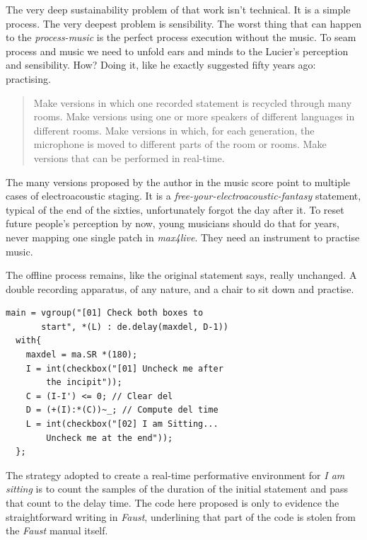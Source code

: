 \documentclass[twoside,a4paper]{article}
\begin{document}

The very deep sustainability problem of that work isn't technical. It is a simple process. The very deepest problem is sensibility. The worst thing that can happen to the \emph{process-music} is the perfect process execution without the music. To seam process and music we need to unfold ears and minds to the Lucier's perception and sensibility. How? Doing it, like he exactly suggested fifty years ago: practising. 

\begin{quote}
Make versions in which one recorded statement is recycled through many rooms. Make versions using one or more speakers of different languages in different rooms. Make versions in which, for each generation, the microphone is moved to different parts of the room or rooms. Make versions that can be performed in real-time. \cite{lais69}
\end{quote}

The many versions proposed by the author in the music score point to multiple cases of electroacoustic staging. It is a \emph{free-your-electroacoustic-fantasy} statement, typical of the end of the sixties, unfortunately forgot the day after it. To reset future people's perception by now, young musicians should do that for years, never mapping one single patch in \emph{max4live}. They need an instrument to practise music. 

The offline process remains, like the original statement says, really unchanged. A double recording apparatus, of any nature, and a chair to sit down and practise. 

\begin{lstlisting}
main = vgroup("[01] Check both boxes to
       start", *(L) : de.delay(maxdel, D-1))
  with{
    maxdel = ma.SR *(180);
    I = int(checkbox("[01] Uncheck me after
        the incipit"));
    C = (I-I') <= 0; // Clear del
    D = (+(I):*(C))~_; // Compute del time
    L = int(checkbox("[02] I am Sitting...
        Uncheck me at the end"));
  };
\end{lstlisting}

The strategy adopted to create a real-time performative environment for \emph{I am sitting} is to count the samples of the duration of the initial statement and pass that count to the delay time. The code here proposed is only to evidence the straightforward writing in \emph{Faust}, underlining that part of the code is stolen from the \emph{Faust} manual itself. 
\end{document}

